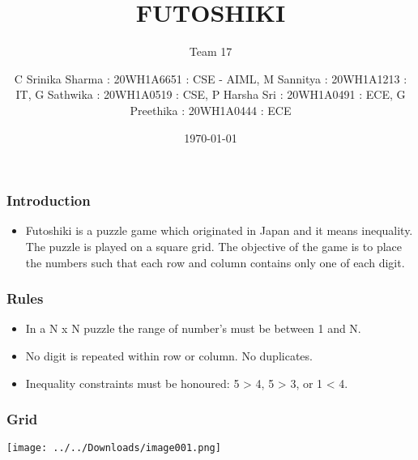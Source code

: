 \documentclass[14pt]{beamer}
\title{FUTOSHIKI}
\subtitle{Team 17}
\date{\today}
\author[14pt]{C Srinika Sharma : 20WH1A6651 : CSE - AIML, M Sannitya : 20WH1A1213 : IT, G Sathwika : 20WH1A0519 : CSE, P Harsha Sri : 20WH1A0491 : ECE, G Preethika : 20WH1A0444 : ECE}
\begin{document}
  
  \begin{frame}
        \titlepage
    \end{frame}
  
  \begin{frame}
	\frametitle{Introduction}
        
	\begin{itemize}
	    \item Futoshiki is a puzzle game which originated in Japan and it means inequality. The puzzle is played on a square grid. The objective of the game is to place the numbers such that each row and column contains only one of each digit.
	\end{itemize}
	
  \end{frame}
   \begin{frame}
	\frametitle{Rules}

	\begin{itemize}
	    \item In a N x N puzzle the range of number's must be between 1 and N.  
	\end{itemize}

	\begin{itemize}
	    \item No digit is repeated within row or column. No duplicates. 
	\end{itemize}

	\begin{itemize}
	    \item Inequality constraints must be honoured: 5 > 4, 5 > 3, or 1 < 4.
	\end{itemize}
  \end{frame}
 \begin{frame}
	\frametitle{Grid}
        
	\texttt{[image: ../../Downloads/image001.png]}
	
  \end{frame}
   
 
\end{document}
